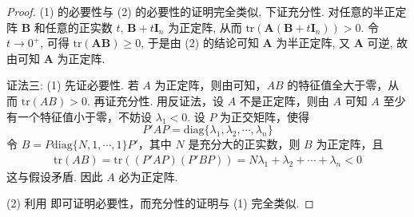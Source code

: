 \documentclass[../../main.tex]{subfiles}%
\begin{document}
\begin{proof}
(1) 的必要性与 (2) 的必要性的证明完全类似, 下证充分性. 对任意的半正定阵 \(\boldsymbol{B}\) 和任意的正实数 \(t\), \(\boldsymbol{B}+t\boldsymbol{I}_n\) 为正定阵, 从而 \(\mathrm{tr}(\boldsymbol{A}(\boldsymbol{B}+t\boldsymbol{I}_n))>0\). 令 \(t\to0^+\), 可得 \(\mathrm{tr}(\boldsymbol{A}\boldsymbol{B})\geqslant 0\), 于是由 (2) 的结论可知 \(\boldsymbol{A}\) 为半正定阵, 又 \(\boldsymbol{A}\) 可逆, 故由可知 \(\boldsymbol{A}\) 为正定阵.

{\color{blue}证法三:}
(1) 先证必要性. 若 \(A\) 为正定阵，则由可知，\(AB\) 的特征值全大于零，从而 \(\mathrm{tr}(AB)>0\). 再证充分性. 用反证法，设 \(A\) 不是正定阵，则由 \(A\) 可知 \(A\) 至少有一个特征值小于零，不妨设 \(\lambda_1 < 0\). 设 \(P\) 为正交矩阵，使得
\[
P'AP = \mathrm{diag}\{\lambda_1,\lambda_2,\cdots,\lambda_n\}
\]
令 \(B = P\mathrm{diag}\{N,1,\cdots,1\}P'\)，其中 \(N\) 是充分大的正实数，则 \(B\) 为正定阵，且
\begin{align*}
\mathrm{tr}(AB) = \mathrm{tr}\left((P'AP)(P'BP)\right) = N\lambda_1 + \lambda_2 + \cdots + \lambda_n < 0
\end{align*}
这与假设矛盾. 因此 \(A\) 必为正定阵.

(2) 利用 即可证明必要性，而充分性的证明与 (1) 完全类似. 

\end{proof}
\end{document}
